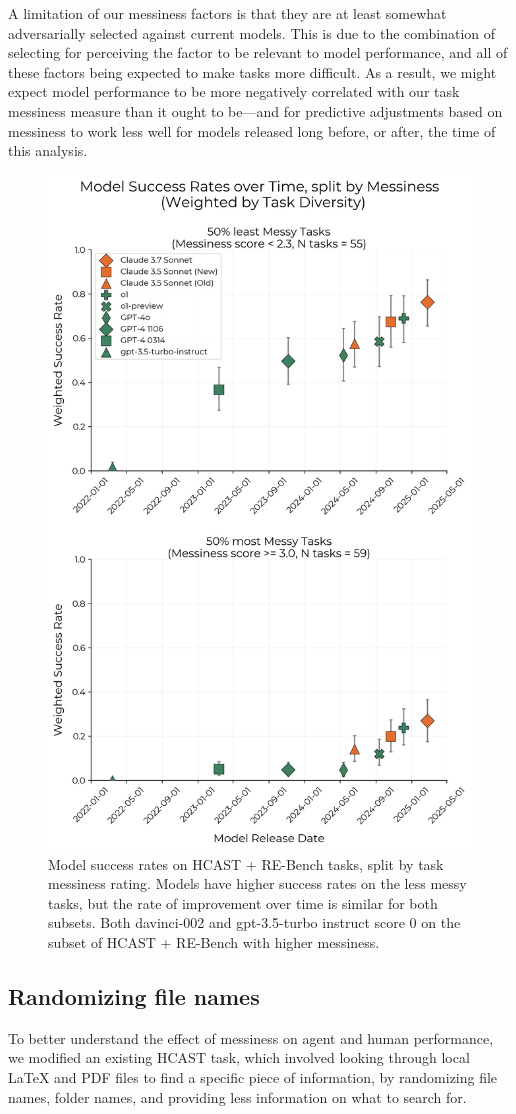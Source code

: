 \documentclass{article}
\newcommand{\gabenchmark}{HCAST}
\begin{document}
A limitation of our messiness factors is that they are at least somewhat adversarially selected against current models. This is due to the combination of selecting for perceiving the factor to be relevant to model performance, and all of these factors being expected to make tasks more difficult. As a result, we might expect model performance to be more negatively correlated with our task messiness measure than it ought to be---and for predictive adjustments based on messiness to work less well for models released long before, or after, the time of this analysis.

\begin{figure}
    \centering
    \includegraphics[width=0.6\linewidth]{plots/messiness/success_trend_by_messiness_with_boundary_0.5.png}
    \caption{Model success rates on \gabenchmark{} + RE-Bench tasks, split by task messiness rating. Models have higher success rates on the less messy tasks, but the rate of improvement over time is similar for both subsets. Both davinci-002 and gpt-3.5-turbo instruct score 0 on the subset of \gabenchmark{} + RE-Bench with higher messiness.}
    \label{fig:least-and-most-messy}
\end{figure}

\subsection{Randomizing file names}
To better understand the effect of messiness on agent and human performance, we modified an existing \gabenchmark{} task, which involved looking through local LaTeX and PDF files to find a specific piece of information, by randomizing file names, folder names, and providing less information on what to search for.
\end{document}
